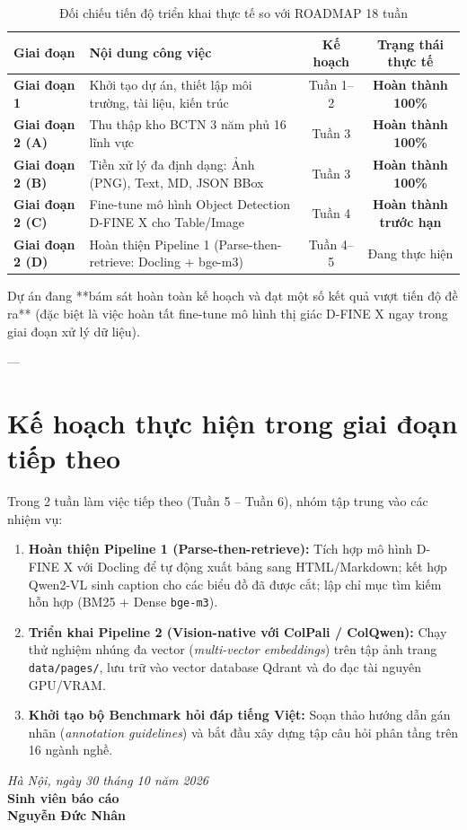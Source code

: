 \documentclass[a4paper,12pt]{article}
\begin{document}
\begin{table}[htbp]
    \centering
    \small
    \caption{Đối chiếu tiến độ triển khai thực tế so với ROADMAP 18 tuần}
    \vspace{0.2cm}
    \begin{tabularx}{\textwidth}{p{2.5cm}Xcc}
        \toprule
        \textbf{Giai đoạn} & \textbf{Nội dung công việc} & \textbf{Kế hoạch} & \textbf{Trạng thái thực tế} \\
        \midrule
        \textbf{Giai đoạn 1} & Khởi tạo dự án, thiết lập môi trường, tài liệu, kiến trúc & Tuần 1--2 & \textbf{Hoàn thành 100\%} \\
        \textbf{Giai đoạn 2 (A)} & Thu thập kho BCTN 3 năm phủ 16 lĩnh vực & Tuần 3 & \textbf{Hoàn thành 100\%} \\
        \textbf{Giai đoạn 2 (B)} & Tiền xử lý đa định dạng: Ảnh (PNG), Text, MD, JSON BBox & Tuần 3 & \textbf{Hoàn thành 100\%} \\
        \textbf{Giai đoạn 2 (C)} & Fine-tune mô hình Object Detection D-FINE X cho Table/Image & Tuần 4 & \textbf{Hoàn thành trước hạn} \\
        \textbf{Giai đoạn 2 (D)} & Hoàn thiện Pipeline 1 (Parse-then-retrieve: Docling + bge-m3) & Tuần 4--5 & Đang thực hiện \\
        \bottomrule
    \end{tabularx}
\end{table}

\begin{highlightbox}
    Dự án đang **bám sát hoàn toàn kế hoạch và đạt một số kết quả vượt tiến độ đề ra** (đặc biệt là việc hoàn tất fine-tune mô hình thị giác D-FINE X ngay trong giai đoạn xử lý dữ liệu).
\end{highlightbox}

---

\section{Kế hoạch thực hiện trong giai đoạn tiếp theo}

Trong 2 tuần làm việc tiếp theo (Tuần 5 -- Tuần 6), nhóm tập trung vào các nhiệm vụ:
\begin{enumerate}
    \item \textbf{Hoàn thiện Pipeline 1 (Parse-then-retrieve):} Tích hợp mô hình D-FINE X với Docling để tự động xuất bảng sang HTML/Markdown; kết hợp Qwen2-VL sinh caption cho các biểu đồ đã được cắt; lập chỉ mục tìm kiếm hỗn hợp (BM25 + Dense \texttt{bge-m3}).
    \item \textbf{Triển khai Pipeline 2 (Vision-native với ColPali / ColQwen):} Chạy thử nghiệm nhúng đa vector (\textit{multi-vector embeddings}) trên tập ảnh trang \texttt{data/pages/}, lưu trữ vào vector database Qdrant và đo đạc tài nguyên GPU/VRAM.
    \item \textbf{Khởi tạo bộ Benchmark hỏi đáp tiếng Việt:} Soạn thảo hướng dẫn gán nhãn (\textit{annotation guidelines}) và bắt đầu xây dựng tập câu hỏi phân tầng trên 16 ngành nghề.
\end{enumerate}

\vspace{0.8cm}
\begin{flushright}
    \textit{Hà Nội, ngày 30 tháng 10 năm 2026}\\[0.2cm]
    \textbf{Sinh viên báo cáo}\\[1.5cm]
    \textbf{Nguyễn Đức Nhân}
\end{flushright}
\end{document}
